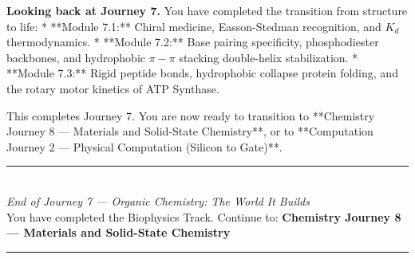 \documentclass[12pt, a4paper]{book}
\begin{document}
\medskip
\noindent\textbf{Looking back at Journey 7.}
You have completed the transition from structure to life:
* **Module 7.1:** Chiral medicine, Easson-Stedman recognition, and $K_d$ thermodynamics.
* **Module 7.2:** Base pairing specificity, phosphodiester backbones, and hydrophobic $\pi-\pi$ stacking double-helix stabilization.
* **Module 7.3:** Rigid peptide bonds, hydrophobic collapse protein folding, and the rotary motor kinetics of ATP Synthase.

This completes Journey 7. You are now ready to transition to **Chemistry Journey 8 --- Materials and Solid-State Chemistry**, or to **Computation Journey 2 --- Physical Computation (Silicon to Gate)**.

\vspace{1.4cm}
\begin{center}
{\color{JourneyColor}\rule{0.5\linewidth}{0.8pt}}\\[6pt]
{\small\color{JourneyColor}\textit{End of Journey 7 --- Organic Chemistry: The World It Builds}}\\[4pt]
{\small\color{JourneyColor}You have completed the Biophysics Track. Continue to: \textbf{Chemistry Journey 8 --- Materials and Solid-State Chemistry}}\\[6pt]
{\color{JourneyColor}\rule{0.5\linewidth}{0.8pt}}
\end{center}
\end{document}
